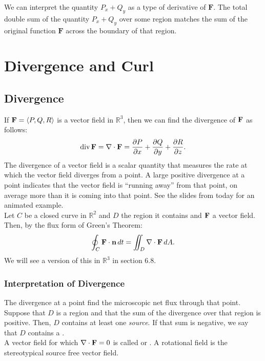We can interpret the quantity \(P_x + Q_y\) as a type of derivative of \(\mathbf{F}\). The total double sum of the quantity \(P_x + Q_y\) over some region matches the sum of the original function \(\mathbf{F}\) across the boundary of that region.


\newpage

\section{Divergence and Curl}

\subsection{Divergence}

If \(\mathbf{F} = \langle P, Q, R \rangle\) is a vector field in \(\mathbb{R}^3\), then we can find the divergence of \(\mathbf{F}\) as follows:
\[
    \text{div} \, \mathbf{F} = \nabla \cdot \mathbf{F} = \frac{\partial P}{\partial x} + \frac{\partial Q}{\partial y} + \frac{\partial R}{\partial z}.
\]
The divergence of a vector field is a scalar quantity that measures the rate at which the vector field diverges from a point. A large positive divergence at a point indicates that the vector field is “running away” from that point, on average more than it is coming into that point. See the slides from today for an animated example. \\

Let \(C\) be a closed curve in \(\mathbb{R}^2\) and \(D\) the region it contains and \(\mathbf{F}\) a vector field. Then, by the flux form of Green’s Theorem:
\[
    \oint_C \mathbf{F} \cdot \mathbf{n} \, dt = \iint_D \nabla \cdot \mathbf{F} \, dA.
\]
We will see a version of this in \(\mathbb{R}^3\) in section 6.8.

\subsubsection{Interpretation of Divergence}

The divergence at a point find the microscopic net flux through that point. \\

Suppose that \(D\) is a region and that the sum of the divergence over that region is positive. Then, \(D\) contains at least one \textit{source}. If that sum is negative, we say that \(D\) contains a . \\

A vector field for which \(\nabla \cdot \mathbf{F} = 0\) is called  or . A rotational field is the stereotypical source free vector field.

